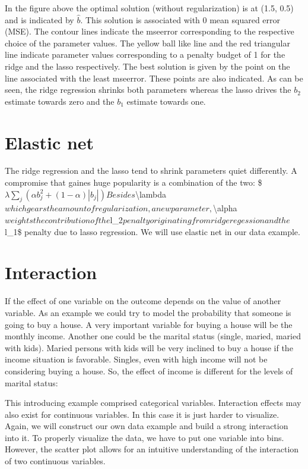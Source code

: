 \documentclass[letterpaper,10pt,english]{jupyterBook}
\begin{document}
\sphinxAtStartPar
In the figure above the optimal solution (without regularization) is at (1.5, 0.5) and is indicated by \(\hat{b}\). This solution is associated with 0 mean squared error (MSE).
The contour lines indicate the mse\sphinxhyphen{}error corresponding to the respective choice of the parameter values.
The yellow ball like line and the red triangular line indicate parameter values corresponding to a penalty budget of 1 for the ridge and the lasso respectively. The best solution is given by the point on the line associated with the least mse\sphinxhyphen{}error. These points are also indicated.
As can be seen, the ridge regression shrinks both parameters whereas the lasso drives the \(b_2\) estimate towards zero and the \(b_1\) estimate towards one.


\chapter{Elastic net}
\label{\detokenize{Regression_Techniques:elastic-net}}
\sphinxAtStartPar
The ridge regression and the lasso tend to shrink parameters quiet differently. A compromise that gaines huge popularity is a combination of the two:
\$\( \lambda\sum_j (\alpha b_j^2 + (1-\alpha)|b_j|)\)\(
Besides \)\textbackslash{}lambda\( which gears the amount of regularization, a new parameter, \)\textbackslash{}alpha\( weights the contribution of the \)l\_2\( penalty originating from ridge regession and the \)l\_1\$ penalty due to lasso regression.
We will use elastic net in our data example.


\chapter{Interaction}
\label{\detokenize{Regression_Techniques:interaction}}
\sphinxAtStartPar
If the effect of one variable on the outcome depends on the value of another variable. As an example we could try to model the probability that someone is going to buy a house. A very important variable for buying a house will be the monthly income. Another one could be the marital status (single, maried, maried with kids). Maried persons with kids will be very inclined to buy a house if the income situation is favorable. Singles, even with high income will not be considering buying a house. So, the effect of income is different for the levels of marital status:

\noindent{}

\sphinxAtStartPar
This introducing example comprised categorical variables. Interaction effects may also exist for continuous variables. In this case it is just harder to visualize. Again, we will construct our own data example and build a strong interaction into it. To properly visualize the data, we have to put one variable into bins. However, the scatter plot allows for an intuitive understanding of the interaction of two continuous variables.
\end{document}
